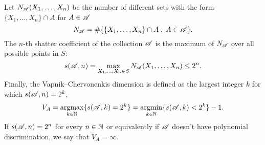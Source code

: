 \begin{definition}
    Let $N_\AA (X_1,\ldots, X_n)$ be the number of different sets with the form $\{X_1,\ldots,X_n\}\cap A$ for $A \in \AA$
\[ N_\AA = \#\{\{X_1,\ldots,X_n\}\cap A \; ;\; A\in\AA\}.  \] 
The $n$-th shatter coefficient of the collection $\AA$ is the maximum of $N_\AA$ over all possible points in $S$:
\[ s(\AA, n) = \max_{X_1,\ldots, X_n \in S} N_\AA(X_1,\ldots, X_n) \leq 2^n. \]
Finally, the Vapnik–Chervonenkis dimension is defined as the largest integer $k$ for which $s(\AA, n) = 2^k$,
\[ V_A = \underset{k\in \N}{\text{argmax}} \{s(\AA, k) = 2^k\} = \underset{k\in \N}{\text{argmin}} \{s(\AA, k) < 2^k\} - 1. \]  
If $s(\AA, n) = 2^n$ for every $n\in \N$ or equivalently if $\AA$ doesn't have polynomial discrimination, we say that $V_A = \infty$.
\end{definition}

